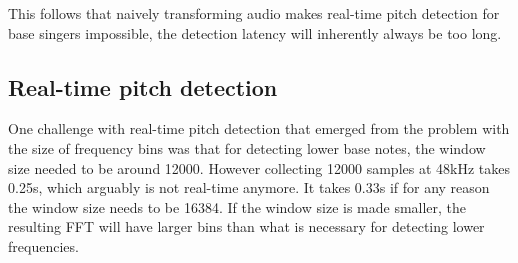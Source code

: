 This follows that naively transforming audio makes real-time pitch detection for base singers impossible, the detection latency will inherently always be too long.
\subsection{Real-time pitch detection}
One challenge with real-time pitch detection that emerged from the problem with the size of frequency bins was that for detecting lower base notes, the window size needed to be around 12000. However collecting 12000 samples at 48kHz takes 0.25s, which arguably is not real-time anymore. It takes 0.33s if for any reason the window size needs to be 16384. If the window size is made smaller, the resulting FFT will have larger bins than what is necessary for detecting lower frequencies. 
